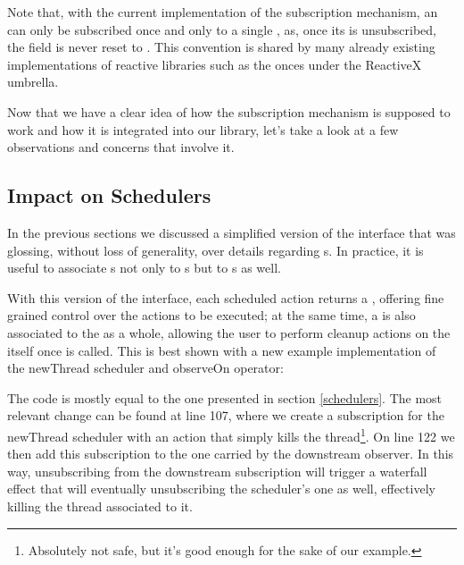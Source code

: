 Note that, with the current implementation of the subscription mechanism, an  can only be subscribed once and only to a single , as, once its  is unsubscribed, the  field is never reset to . This convention is shared by many already existing implementations of reactive libraries such as the onces under the ReactiveX umbrella\cite{rxjava-wiki}.

Now that we have a clear idea of how the subscription mechanism is supposed to work and how it is integrated into our library, let's take a look at a few observations and concerns that involve it. 

\subsection{Impact on Schedulers}

In the previous sections we discussed a simplified version of the  interface that was glossing, without loss of generality, over details regarding s. In practice, it is useful to associate s not only to s but to s as well. 


With this version of the interface, each scheduled action returns a , offering fine grained control over the actions to be executed; at the same time, a  is also associated to the  as a whole, allowing the user to perform cleanup actions on the  itself once  is called. This is best shown with a new example implementation of the newThread scheduler and observeOn operator:


The code is mostly equal to the one presented in section \ref{schedulers}. The most relevant change can be found at line 107, where we create a subscription for the newThread scheduler with an action that simply kills the thread\footnote{Absolutely not safe, but it's good enough for the sake of our example.}. On line 122 we then add this subscription to the one carried by the downstream observer. In this way, unsubscribing from the downstream subscription will trigger a waterfall effect that will eventually unsubscribing the scheduler's one as well, effectively killing the thread associated to it.

